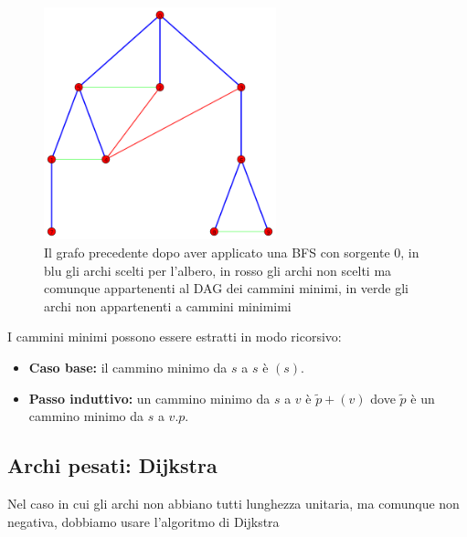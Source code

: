 \documentclass[a4paper,10pt]{amsbook}
\theoremstyle{plain}
\theoremstyle{definition}
\theoremstyle{remark}
\begin{document}
\begin{figure}[h]
  \centering
  \includegraphics[width=0.6\textwidth]{BFS}
  \caption{Il grafo precedente dopo aver applicato una BFS con
    sorgente $0$, in blu gli archi scelti per l'albero, in rosso gli
    archi non scelti ma comunque appartenenti al DAG dei cammini
    minimi, in verde gli archi non appartenenti a cammini minimimi}
  \label{fig:BFS}
\end{figure}

I cammini minimi possono essere estratti in modo ricorsivo:
\begin{itemize}
\item \textbf{Caso base:} il cammino minimo da $s$ a $s$ \`e $(s)$.
\item \textbf{Passo induttivo:} un cammino minimo da $s$ a $v$ \`e
  $\tilde p + (v)$ dove $\tilde p$ \`e un cammino minimo da $s$ a $v.p$.
\end{itemize}

\subsection{Archi pesati: Dijkstra}

Nel caso in cui gli archi non abbiano tutti lunghezza unitaria, ma
comunque non negativa, dobbiamo usare l'algoritmo di Dijkstra
\end{document}
